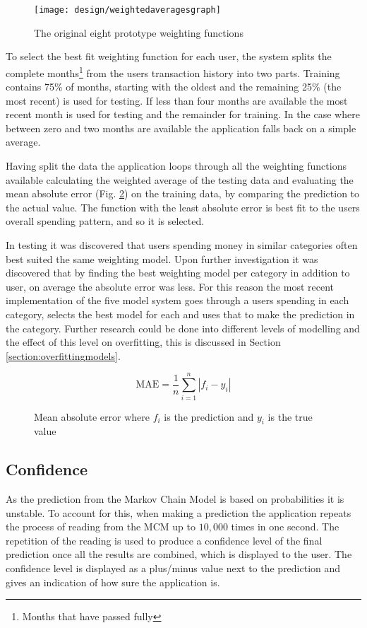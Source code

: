 \begin{figure}[h]
    \centering
    \texttt{[image: design/weightedaveragesgraph]}
    \caption{The original eight prototype weighting functions}
    \label{fig:weightedaveragegraph}
\end{figure}

To select the best fit weighting function for each user, the system splits the complete months\footnote{Months that have passed fully} from the users transaction history into two parts. Training contains 75\% of months, starting with the oldest and the remaining 25\% (the most recent) is used for testing.
%
If less than four months are available the most recent month is used for testing and the remainder for training. In the case where between zero and two months are available the application falls back on a simple average.

Having split the data the application loops through all the weighting functions available calculating the weighted average of the testing data and evaluating the mean absolute error (Fig. \ref{fig:absoluteerror}) on the training data, by comparing the prediction to the actual value. The function with the least absolute error is best fit to the users overall spending pattern, and so it is selected.

In testing it was discovered that users spending money in similar categories often best suited the same weighting model. Upon further investigation it was discovered that by finding the best weighting model per category in addition to user, on average the absolute error was less. For this reason the most recent implementation of the five model system goes through a users spending in each category, selects the best model for each and uses that to make the prediction in the category. Further research could be done into different levels of modelling and the effect of this level on overfitting, this is discussed in Section \ref{section:overfittingmodels}.

\begin{figure}[h]
    \centering
    \[
        \mathrm{MAE} = \frac{1}{n}\sum_{i=1}^n \left| f_i-y_i\right| 
    \]
    \caption[Mean absolute error formula]{Mean absolute error where $f_i$ is the prediction and $y_i$ is the true value}
    \label{fig:absoluteerror}
\end{figure}

 

\subsection{Confidence}
As the prediction from the Markov Chain Model is based on probabilities it is unstable. To account for this, when making a prediction the application repeats the process of reading from the MCM up to $10,000$ times in one second. The repetition of the reading is used to produce a confidence level of the final prediction once all the results are combined, which is displayed to the user. The confidence level is displayed as a plus/minus value next to the prediction and gives an indication of how sure the application is. 

